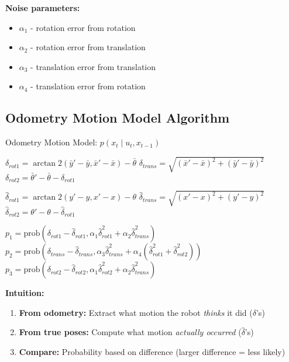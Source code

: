 \textbf{Noise parameters:}
\begin{itemize}
    \item $\alpha_1$ - rotation error from rotation
    \item $\alpha_2$ - rotation error from translation
    \item $\alpha_3$ - translation error from translation
    \item $\alpha_4$ - translation error from rotation
\end{itemize}

\subsection{Odometry Motion Model Algorithm}

\begin{algorithm}[H]
\caption{Odometry Motion Model: $p(x_t \mid u_t, x_{t-1})$}

\BlankLine
{}
$\delta_{rot1} = \arctan2(\bar{y}' - \bar{y}, \bar{x}' - \bar{x}) - \bar{\theta}$\;
$\delta_{trans} = \sqrt{(\bar{x}' - \bar{x})^2 + (\bar{y}' - \bar{y})^2}$\;
$\delta_{rot2} = \bar{\theta}' - \bar{\theta} - \delta_{rot1}$\;

\BlankLine
{}
$\hat{\delta}_{rot1} = \arctan2(y' - y, x' - x) - \theta$\;
$\hat{\delta}_{trans} = \sqrt{(x' - x)^2 + (y' - y)^2}$\;
$\hat{\delta}_{rot2} = \theta' - \theta - \hat{\delta}_{rot1}$\;

\BlankLine
{}
$p_1 = \text{prob}(\delta_{rot1} - \hat{\delta}_{rot1}, \alpha_1 \hat{\delta}_{rot1}^2 + \alpha_2 \hat{\delta}_{trans}^2)$\;
$p_2 = \text{prob}(\delta_{trans} - \hat{\delta}_{trans}, \alpha_3 \hat{\delta}_{trans}^2 + \alpha_4 (\hat{\delta}_{rot1}^2 + \hat{\delta}_{rot2}^2))$\;
$p_3 = \text{prob}(\delta_{rot2} - \hat{\delta}_{rot2}, \alpha_1 \hat{\delta}_{rot2}^2 + \alpha_2 \hat{\delta}_{trans}^2)$\;

\BlankLine
{}
\end{algorithm}

\textbf{Intuition:}
\begin{enumerate}
    \item \textbf{From odometry:} Extract what motion the robot \textit{thinks} it did ($\delta$'s)
    \item \textbf{From true poses:} Compute what motion \textit{actually occurred} ($\hat{\delta}$'s)
    \item \textbf{Compare:} Probability based on difference (larger difference = less likely)
\end{enumerate}

